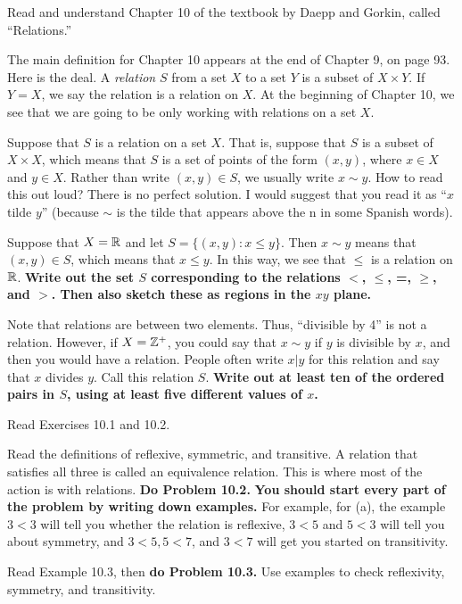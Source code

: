 
Read and understand Chapter 10 of the textbook by Daepp and Gorkin, called ``Relations.''

The main definition for Chapter 10 appears at the end of Chapter 9, on page 93.  Here is the deal.  A {\em relation} $S$ from a set $X$ to a set $Y$ is a subset of $X \times Y$.  If $Y = X$, we say the relation is a relation on $X$.
At the beginning of Chapter 10, we see that we are going to be only working with relations on a set $X$.

Suppose that $S$ is a relation on a set $X$.
That is, suppose that $S$ is a subset of $X \times X$, which means that $S$ is a set of points of the form $(x,y)$, where $x \in X$ and $y \in X$.
Rather than write $(x,y) \in S$, we usually write $x \sim y$.
How to read this out loud?  There is no perfect solution.  I would suggest that you read it as ``$x$ tilde $y$'' (because $\sim$ is the tilde that appears above the n in some Spanish words).

Suppose that $X = \mathbb{R}$ and let $S = \{ (x,y) : x \leq y\}$.
Then $x \sim y$ means that $(x,y) \in S$, which means that $x \leq y$.
In this way, we see that $\leq$ is a relation on $\mathbb{R}$.
{\bf Write out the set $S$ corresponding to the relations $<$, $\leq$, =, $\geq$, and $>$.  Then also sketch these as regions in the $xy$ plane.}

Note that relations are between two elements.
Thus, ``divisible by 4'' is not a relation.
However, if $X = \mathbb{Z}^+$, you could say that $x \sim y$ if $y$ is divisible by $x$, and then you would have a relation.
People often write $x | y$ for this relation and say that $x$ divides $y$.
Call this relation $S$.
{\bf Write out at least ten of the ordered pairs in $S$, using at least five different values of $x$.}

Read Exercises 10.1 and 10.2.  

Read the definitions of reflexive, symmetric, and transitive.
A relation that satisfies all three is called an equivalence relation.
This is where most of the action is with relations.
{\bf Do Problem 10.2.}
{\bf \Large You should start every part of the problem by writing down examples.}
For example, for (a), the example $3 < 3$ will tell you whether the relation is reflexive, $3 < 5$ and $5 < 3$ will tell you about symmetry, and $3 < 5, 5 < 7$, and $3 < 7$ will get you started on transitivity.

Read Example 10.3, then {\bf do Problem 10.3.}
Use examples to check reflexivity, symmetry, and transitivity.

